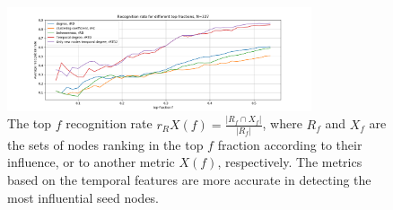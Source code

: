 \documentclass[letterpaper]{article}
\begin{document}

\begin{figure}[ht!]
  \centering
   \includegraphics[width=0.8\textwidth]{img/rank_G.png}
   \caption{The top $f$ recognition rate $r_RX(f) = \frac{ |R_f \cap X_f| }{ |R_f| }$, where $R_f$ and $X_f$ are the sets of nodes ranking in the top $f$ fraction according to their influence,  or to another metric $X(f)$, respectively. The metrics based on the temporal features are more accurate in detecting the most influential seed nodes.}
   \label{fig:rank_G}
\end{figure}
\end{document}
